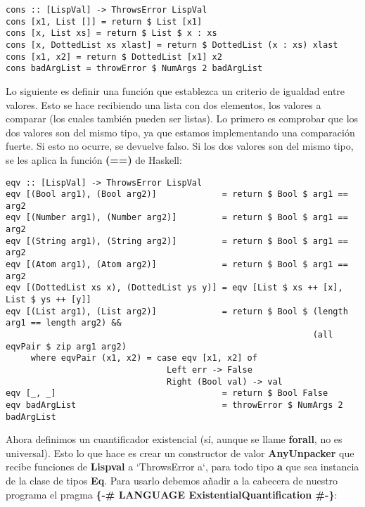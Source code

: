 \begin{minipage}{\linewidth}
\begin{footnotesize}
\begin{lstlisting}[frame=single]
cons :: [LispVal] -> ThrowsError LispVal
cons [x1, List []] = return $ List [x1]
cons [x, List xs] = return $ List $ x : xs
cons [x, DottedList xs xlast] = return $ DottedList (x : xs) xlast
cons [x1, x2] = return $ DottedList [x1] x2
cons badArgList = throwError $ NumArgs 2 badArgList
\end{lstlisting}
\end{footnotesize}
\end{minipage}

Lo siguiente es definir una funci\'on que establezca un criterio de igualdad entre valores. Esto se hace recibiendo una lista con dos elementos, los valores a comparar (los cuales tambi\'en pueden ser listas). Lo primero es comprobar que los dos valores son del mismo tipo, ya que estamos implementando una comparaci\'on fuerte. Si esto no ocurre, se devuelve falso. Si los dos valores son del mismo tipo, se les aplica la funci\'on \textbf{(==)} de Haskell:

\begin{minipage}{\linewidth}
\begin{tiny}
\begin{lstlisting}[frame=single]
eqv :: [LispVal] -> ThrowsError LispVal
eqv [(Bool arg1), (Bool arg2)]             = return $ Bool $ arg1 == arg2
eqv [(Number arg1), (Number arg2)]         = return $ Bool $ arg1 == arg2
eqv [(String arg1), (String arg2)]         = return $ Bool $ arg1 == arg2
eqv [(Atom arg1), (Atom arg2)]             = return $ Bool $ arg1 == arg2
eqv [(DottedList xs x), (DottedList ys y)] = eqv [List $ xs ++ [x], List $ ys ++ [y]]
eqv [(List arg1), (List arg2)]             = return $ Bool $ (length arg1 == length arg2) && 
                                                             (all eqvPair $ zip arg1 arg2)
     where eqvPair (x1, x2) = case eqv [x1, x2] of
                                Left err -> False
                                Right (Bool val) -> val
eqv [_, _]                                 = return $ Bool False
eqv badArgList                             = throwError $ NumArgs 2 badArgList
\end{lstlisting}
\end{tiny}
\end{minipage}

Ahora definimos un cuantificador existencial (s\'i, aunque se llame \textbf{forall}, no es universal). Esto lo que hace es crear un constructor de valor \textbf{AnyUnpacker} que recibe funciones de \textbf{Lispval} a `ThrowsError a`, para todo tipo \textbf{a} que sea instancia de la clase de tipos \textbf{Eq}. Para usarlo debemos a\~nadir a la cabecera de nuestro programa el pragma \textbf{\{-\# LANGUAGE ExistentialQuantification \#-\}}:\\

